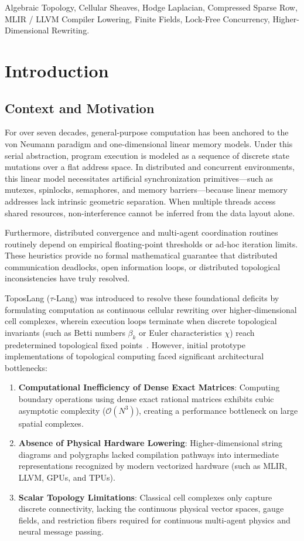 \documentclass[conference]{IEEEtran}
\begin{document}
\begin{IEEEkeywords}
Algebraic Topology, Cellular Sheaves, Hodge Laplacian, Compressed Sparse Row, MLIR / LLVM Compiler Lowering, Finite Fields, Lock-Free Concurrency, Higher-Dimensional Rewriting.
\end{IEEEkeywords}

\section{Introduction}

\subsection{Context and Motivation}
For over seven decades, general-purpose computation has been anchored to the von Neumann paradigm and one-dimensional linear memory models. Under this serial abstraction, program execution is modeled as a sequence of discrete state mutations over a flat address space. In distributed and concurrent environments, this linear model necessitates artificial synchronization primitives---such as mutexes, spinlocks, semaphores, and memory barriers---because linear memory addresses lack intrinsic geometric separation. When multiple threads access shared resources, non-interference cannot be inferred from the data layout alone.

Furthermore, distributed convergence and multi-agent coordination routines routinely depend on empirical floating-point thresholds or ad-hoc iteration limits. These heuristics provide no formal mathematical guarantee that distributed communication deadlocks, open information loops, or distributed topological inconsistencies have truly resolved.

ToposLang ($\tau$-Lang) was introduced to resolve these foundational deficits by formulating computation as continuous cellular rewriting over higher-dimensional cell complexes, wherein execution loops terminate when discrete topological invariants (such as Betti numbers $\beta_k$ or Euler characteristics $\chi$) reach predetermined topological fixed points~\cite{topos2026v1}. However, initial prototype implementations of topological computing faced significant architectural bottlenecks:
\begin{enumerate}
    \item \textbf{Computational Inefficiency of Dense Exact Matrices}: Computing boundary operations using dense exact rational matrices exhibits cubic asymptotic complexity ($\mathcal{O}(N^3)$), creating a performance bottleneck on large spatial complexes.
    \item \textbf{Absence of Physical Hardware Lowering}: Higher-dimensional string diagrams and polygraphs lacked compilation pathways into intermediate representations recognized by modern vectorized hardware (such as MLIR, LLVM, GPUs, and TPUs).
    \item \textbf{Scalar Topology Limitations}: Classical cell complexes only capture discrete connectivity, lacking the continuous physical vector spaces, gauge fields, and restriction fibers required for continuous multi-agent physics and neural message passing.
\end{enumerate}
\end{document}
